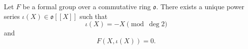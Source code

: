 Let $F$ be a formal group over a commutative ring $\mathfrak{o}$. There exists a unique power series $\iota(X) \in \mathfrak{o}[[X]]$ such that
$$
\iota(X) = -X \pmod{\deg 2}
$$
and
$$
F(X, \iota(X)) = 0.
$$
